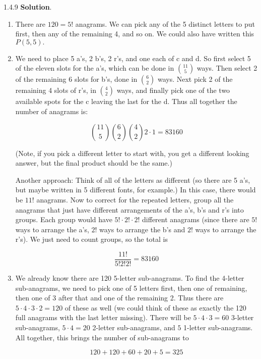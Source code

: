 \documentclass[11pt,]{book}
\theoremstyle{ptxplainnotitle}
\theoremstyle{ptxplaintitle}
\theoremstyle{ptxdefinitionnotitle}
\theoremstyle{ptxdefinitiontitle}
\theoremstyle{ptxdefinitionnotitle}
\theoremstyle{ptxdefinitiontitle}
\theoremstyle{ptxdefinitionnotitle}
\theoremstyle{ptxdefinitiontitle}
\theoremstyle{ptxdefinitiontitlenonumber}
\theoremstyle{ptxdefinitiontitlenonumber}
\numberwithin{equation}{chapter}
\begin{document}
\begin{divisionexercise}{1.4.9}
\textbf{Solution}.\quad%
\hypertarget{p-1683}{}%
\leavevmode%
\begin{enumerate}[label=\alph*.]
\item\hypertarget{li-708}{}\hypertarget{p-1684}{}%
There are \(120 = 5!\) anagrams.  We can pick any of the 5 distinct letters to put first, then any of the remaining 4, and so on.  We could also have written this \(P(5,5)\text{.}\)%
\item\hypertarget{li-709}{}\hypertarget{p-1685}{}%
We need to place 5 a's, 2 b's, 2 r's, and one each of c and d.  So first select 5 of the eleven slots for the a's, which can be done in \({11 \choose 5}\) ways.  Then select 2 of the remaining 6 slots for b's, done in \({6 \choose 2}\) ways.  Next pick 2 of the remaining 4 slots of r's, in \({4 \choose 2}\) ways, and finally pick one of the two available spots for the c leaving the last for the d.  Thus all together the number of anagrams is:%
\par
\hypertarget{p-1686}{}%
%
\begin{equation*}
{11\choose 5}{6 \choose 2}{4 \choose 2}2\cdot 1 = 83160
\end{equation*}
%
\par
\hypertarget{p-1687}{}%
(Note, if you pick a different letter to start with, you get a different looking answer, but the final product should be the same.)%
\par
\hypertarget{p-1688}{}%
Another approach: Think of all of the letters as different (so there are 5 a's, but maybe written in 5 different fonts, for example.)  In this case, there would be \(11!\) anagrams.  Now to correct for the repeated letters, group all the anagrams that just have different arrangements of the a's, b's and r's into groups.  Each group would have \(5!\cdot 2! \cdot 2!\) different anagrams (since there are \(5!\) ways to arrange the a's, \(2!\) ways to arrange the b's and \(2!\) ways to arrange the r's).  We just need to count groups, so the total is%
\par
\hypertarget{p-1689}{}%
%
\begin{equation*}
\frac{11!}{5!2! 2!} = 83160
\end{equation*}
%
\item\hypertarget{li-710}{}\hypertarget{p-1690}{}%
We already know there are 120 5-letter sub-anagrams.  To find the 4-letter sub-anagrams, we need to pick one of 5 letters first, then one of remaining, then one of 3 after that and one of the remaining 2.  Thus there are \(5\cdot 4 \cdot 3 \cdot 2 = 120\) of these as well (we could think of these as exactly the 120 full anagrams with the last letter missing).  There will be \(5 \cdot 4 \cdot 3 = 60\) 3-letter sub-anagrams, \(5\cdot 4 = 20\) 2-letter sub-anagrams, and \(5\) 1-letter sub-anagrams.  All together, this brings the number of sub-anagrams to%
\par
\hypertarget{p-1691}{}%
%
\begin{equation*}
120 + 120 + 60 + 20 + 5 = 325
\end{equation*}
%
\end{enumerate}
%
\end{divisionexercise}%
\end{document}

